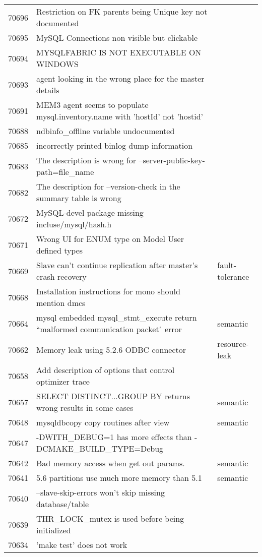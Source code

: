 \begin{longtable}[c]{p{1cm}p{8cm}p{3cm}}
70696 & Restriction on FK parents being Unique key not documented &  \\
70695 & MySQL Connections non visible but clickable &  \\
70694 & MYSQLFABRIC IS NOT EXECUTABLE ON WINDOWS &  \\
70693 & agent looking in the wrong place for the master details &  \\
70691 & MEM3 agent seems to populate mysql.inventory.name with 'hostId' not 'hostid' &  \\
70688 & ndbinfo\_offline variable undocumented &  \\
70685 & incorrectly printed binlog dump information &  \\
70683 & The description is wrong for --server-public-key-path=file\_name &  \\
70682 & The description for --version-check in the summary table is wrong &  \\
70672 & MySQL-devel package missing incluse/mysql/hash.h &  \\
70671 & Wrong UI for ENUM type on Model  User defined types &  \\
70669 & Slave can't continue replication after master's crash recovery & fault-tolerance \\
70668 & Installation instructions for mono should mention dmcs &  \\
70664 & mysql embedded mysql\_stmt\_execute return ``malformed communication packet" error & semantic \\
70662 & Memory leak using 5.2.6 ODBC connector & resource-leak \\
70658 & Add description of options that control optimizer trace & \\
70657 & SELECT DISTINCT...GROUP BY returns wrong results in some cases & semantic \\
70648 & mysqldbcopy copy routines after view & semantic \\
70647 & -DWITH\_DEBUG=1 has more effects than -DCMAKE\_BUILD\_TYPE=Debug &  \\
70642 & Bad memory access when get out params. & semantic \\
70641 & 5.6 partitions use much more memory than 5.1 & semantic \\
70640 & --slave-skip-errors won't skip missing database/table &  \\
70639 & THR\_LOCK\_mutex is used before being initialized &  \\
70634 & 'make test' does not work &  \\

\end{longtable}
